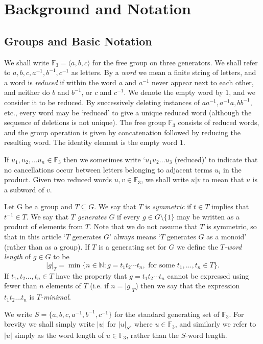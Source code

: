 \documentclass[twoside,11pt]{amsart}
\numberwithin{equation}{section}
\theoremstyle{definition}
\newcommand {\N}{\mathbb N}
\newcommand{\1}{\mathbbm{1}}
\newcommand{\F}{\mathbb F}
\begin{document}
	
	\section{Background and Notation}
	\subsection{Groups and Basic Notation}	
	We shall write $\F_3 = \langle a, b, c \rangle $ for the free group on three generators. 	
	We shall refer to $a,b,c,a^{-1},b^{-1}, c^{-1}$ as letters. By a \textit{word} we mean a finite string of letters, and a word is \textit{reduced} if within the word $a$ and $a^{-1}$ never appear next to each other, and neither do $b$ and $b^{-1}$, or $c$ and $c^{-1}$. We denote the empty word by $1$, and we consider it to be reduced. 
	By successively deleting instances of $aa^{-1}, a^{-1}a, bb^{-1},$ etc., every word may be `reduced' to give a unique reduced word (although the sequence of deletions is not unique).
	The free group $\F_3$ consists of reduced words, and the group operation is given by concatenation followed by reducing the resulting word. The identity element is the empty word $1$.
		
	If $u_1, u_2, \ldots u_n \in \F_3$ then we sometimes write `$u_1u_2 \ldots u_3$ (reduced)' to indicate that no cancellations occur between letters belonging to adjacent terms $u_i$ in the product.		
	Given two reduced words $u,v \in \F_3$, we shall write $u|v$ to mean that $u$ is a subword of $v$. 
	
	Let G be a group and $T \subseteq G$. We say that $T$ is \textit{symmetric} if $t \in T$ implies that $t^{-1} \in T$. We say that \textit{$T$ generates $G$} if every $g \in G \setminus \{ 1 \}$ may be written as a product of elements from $T$. Note that we do not assume that $T$ is symmetric, so that in this article `$T$ generates $G$' always means `$T$ generates $G$ as a monoid' (rather than as a group).  If $T$ is a generating set for $G$ we define the \textit{$T$-word length} of $g \in G$ to be 
	$$|g|_T = \min \{ n \in \N : g = t_1 t_2 \cdots t_n, \text{ for some } t_1, \ldots, t_n \in T \}.$$
	If $t_1,t_2 \ldots, t_n \in T$ have the property that $g = t_1t_2\cdots t_n$ cannot be expressed using fewer than $n$ elements of $T$ (i.e. if $n = |g|_T$) then we say that the expression $t_1t_2 \dots t_n$ is \textit{$T$-minimal}. 
	
	We write $S = \{ a, b, c, a^{-1}, b^{-1} , c^{-1}\}$ for the standard generating set of $\F_3$. For brevity we shall simply write $|u|$ for $|u|_S$, where $u \in \F_3$, and similarly we refer to $|u|$ simply as the word length of $u \in \F_3$, rather than the $S$-word length.	
	
\end{document}
